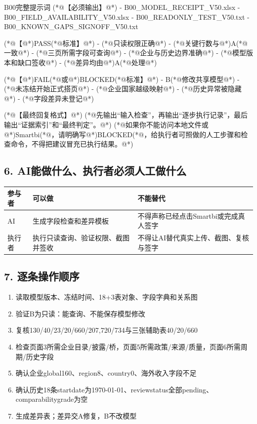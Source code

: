 \documentclass[UTF8,openany,zihao=-4]{ctexbook}
\renewcommand{\_}{\textunderscore\allowbreak}
\begin{document}
\begin{PromptBox}{B00完整提示词}
(*@{\promptcjk 【必须输出】}@*)
- B00_MODEL_RECEIPT_V50.xlsx
- B00_FIELD_AVAILABILITY_V50.xlsx
- B00_READONLY_TEST_V50.txt
- B00_KNOWN_GAPS_SIGNOFF_V50.txt

(*@{\promptcjk 【}@*)PASS(*@{\promptcjk 标准】}@*)
- (*@{\promptcjk 只读权限正确}@*)
- (*@{\promptcjk 关键行数与}@*)A(*@{\promptcjk 一致}@*)
- (*@{\promptcjk 三页所需字段可查询}@*)
- (*@{\promptcjk 企业与历史边界准确}@*)
- (*@{\promptcjk 模型版本和缺口签收}@*)
- (*@{\promptcjk 差异均由}@*)A(*@{\promptcjk 处理}@*)

(*@{\promptcjk 【}@*)FAIL(*@{\promptcjk 或}@*)BLOCKED(*@{\promptcjk 标准】}@*)
- B(*@{\promptcjk 修改共享模型}@*)
- (*@{\promptcjk 未冻结开始正式搭页}@*)
- (*@{\promptcjk 企业国家越级映射}@*)
- (*@{\promptcjk 历史异常被隐藏}@*)
- (*@{\promptcjk 字段差异未登记}@*)

(*@{\promptcjk 【最终回复格式】}@*)
(*@{\promptcjk 先输出“输入检查”，再输出“逐步执行记录”，最后输出“证据索引”和“最终判定”。}@*)
(*@{\promptcjk 如果你不能访问本地文件或}@*)Smartbi(*@{\promptcjk ，请明确写}@*)BLOCKED(*@{\promptcjk ，给执行者可照做的人工步骤和检查命令，不得把建议冒充已执行结果。}@*)
\end{PromptBox}

\subsection*{6. AI能做什么、执行者必须人工做什么}
\noindent\begin{tabularx}{\textwidth}{@{}p{}XX@{}}
\toprule
\textbf{参与者} & \textbf{可以做} & \textbf{不能替代} \\
\midrule
AI & 生成字段检查和差异模板 & 不得声称已经点击Smartbi或完成真人签字 \\
执行者 & 执行只读查询、验证权限、截图并签收 & 不得让AI替代真实上传、截图、复核与签字 \\
\bottomrule
\end{tabularx}

\subsection*{7. 逐条操作顺序}
\begin{enumerate}
\item 读取模型版本、冻结时间、18+3表对象、字段字典和关系图
\item 验证B为只读：能查询、不能保存模型修改
\item 复核130/40/23/20/660/207,720/734与三张辅助表40/20/660
\item 检查页面3所需企业目录/披露/桥，页面5所需政策/来源/质量，页面6所需周期/历史字段
\item 确认企业global160、region8、country0、海外收入字段不足
\item 确认历史18条start\_date为1970-01-01、review\_status全部pending、comparability\_grade为空
\item 生成差异表；差异交A修复，B不改模型
\end{enumerate}
\end{document}
